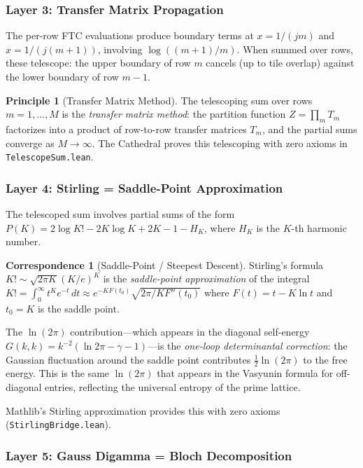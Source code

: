 \documentclass[11pt,a4paper]{article}
\theoremstyle{definition}
\newtheorem{principle}[definition]{Principle}
\newtheorem{correspondence}[definition]{Correspondence}
\newcommand{\lean}[1]{\texttt{#1}}
\begin{document}
\subsubsection{Layer 3: Transfer Matrix Propagation}

The per-row FTC evaluations produce boundary terms at $x = 1/(jm)$
and $x = 1/(j(m+1))$, involving $\log((m+1)/m)$. When summed over
rows, these telescope: the upper boundary of row $m$ cancels (up to
tile overlap) against the lower boundary of row $m-1$.

\begin{principle}[Transfer Matrix Method]
The telescoping sum over rows $m = 1, \ldots, M$ is the
\emph{transfer matrix method}: the partition function
$Z = \prod_{m} T_m$ factorizes into a product of row-to-row
transfer matrices $T_m$, and the partial sums
converge as $M \to \infty$. The Cathedral proves this telescoping
with zero axioms in \lean{TelescopeSum.lean}.
\end{principle}

\subsubsection{Layer 4: Stirling = Saddle-Point Approximation}

The telescoped sum involves partial sums of the form
$P(K) = 2\log K! - 2K\log K + 2K - 1 - H_K$, where $H_K$ is
the $K$-th harmonic number.

\begin{correspondence}[Saddle-Point / Steepest Descent]
Stirling's formula $K! \sim \sqrt{2\pi K}(K/e)^K$ is the
\emph{saddle-point approximation} of the integral
$K! = \int_0^\infty t^K e^{-t}\,dt \approx e^{-KF(t_0)}\sqrt{2\pi/KF''(t_0)}$
where $F(t) = t - K\ln t$ and $t_0 = K$ is the saddle point.

The $\ln(2\pi)$ contribution---which appears in the diagonal self-energy
$G(k,k) = k^{-2}(\ln 2\pi - \gamma - 1)$---is the \emph{one-loop
determinantal correction}: the Gaussian fluctuation around the saddle
point contributes $\tfrac{1}{2}\ln(2\pi)$ to the free energy.
This is the same $\ln(2\pi)$ that appears in the Vasyunin formula
for off-diagonal entries, reflecting the universal entropy of the
prime lattice.

Mathlib's Stirling approximation provides this with zero axioms
(\lean{StirlingBridge.lean}).
\end{correspondence}

\subsubsection{Layer 5: Gauss Digamma = Bloch Decomposition}
\end{document}

